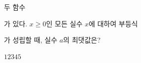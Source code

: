 두 함수 \par\smallskip{}\par\smallskip\noindent 가 있다. $x\ge 0$인 모든 실수 $x$에 대하여 부등식 \par\smallskip{}\par\smallskip\noindent 가 성립할 때, 실수 $a$의 최댓값은?
\begin{choices32}{$1$}{$2$}{$3$}{$4$}{$5$}\end{choices32}
